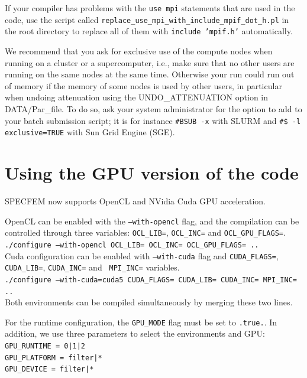 \documentclass[oneside,english]{book}
\begin{document}
If your compiler has problems with the \texttt{use mpi} statements that are used in the code, use the script called
\texttt{replace\_use\_mpi\_with\_include\_mpif\_dot\_h.pl} in the root directory to replace all of them with \texttt{include 'mpif.h'} automatically.

We recommend that you ask for exclusive use of the compute nodes when running on a cluster or a supercomputer, i.e., make sure that no other users
are running on the same nodes at the same time. Otherwise your run could run out of memory if the memory of some nodes is used by other users, in particular
when undoing attenuation using the UNDO\_ATTENUATION option in DATA/Par\_file.
To do so, ask your system administrator for the option to add to your batch submission script; it is for instance
\texttt{\#BSUB -x} with SLURM and \texttt{\#\$ -l exclusive=TRUE} with Sun Grid Engine (SGE).

\section{Using the GPU version of the code}

SPECFEM now supports OpenCL and NVidia Cuda GPU acceleration.

OpenCL can be enabled with the \texttt{--with-opencl} flag, and the
compilation can be controlled through three variables: \texttt{OCL\_LIB=},
\texttt{OCL\_INC=} and \texttt{OCL\_GPU\_FLAGS=}.\\

\noindent
\texttt{./configure --with-opencl OCL\_LIB= OCL\_INC= OCL\_GPU\_FLAGS=
..}\\


Cuda configuration can be enabled with \texttt{--with-cuda} flag and
\texttt{CUDA\_FLAGS=}, \texttt{CUDA\_LIB=}, \texttt{CUDA\_INC=}
and \texttt{ MPI\_INC=} variables.\\

\noindent
\texttt{./configure --with-cuda=cuda5 CUDA\_FLAGS= CUDA\_LIB= CUDA\_INC= MPI\_INC= ..}\\

Both environments can be compiled simultaneously by merging these two lines.

For the runtime configuration, the \texttt{GPU\_MODE} flag must be set
to \texttt{.true.}. In addition, we use three parameters to select the
environments and GPU: \\

\noindent
\texttt{GPU\_RUNTIME = 0|1|2}\\
\texttt{GPU\_PLATFORM = filter|*}\\
\texttt{GPU\_DEVICE = filter|*}\\
\end{document}
